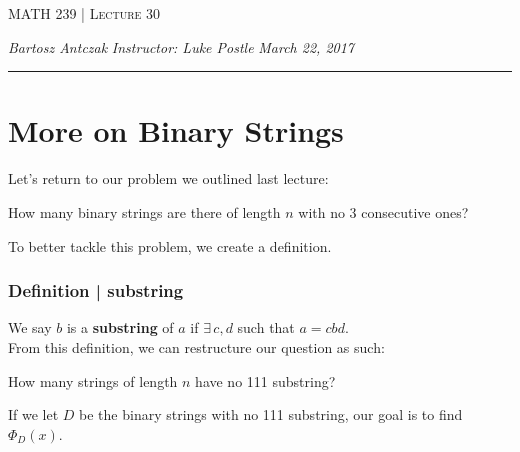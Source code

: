 \documentclass{report}
\newcommand{\lectureNum}{30}
\newcommand{\curDate}{March 22, 2017}
\newcommand{\course}{MATH 239}
\newcommand{\instructor}{Luke Postle}
\begin{document}
\begin{center}
\begin{Large}
\textsc{\course{} | Lecture \lectureNum{}}
\end{Large}
\end{center} 
\noindent \textit{Bartosz Antczak} \hfill
\textit{Instructor: \instructor{}} \hfill
\textit{\curDate{}}
\rule{\textwidth}{0.4pt}
\section{More on Binary Strings}
Let's return to our problem we outlined last lecture:
\begin{center}
How many binary strings are there of length $n$ with no 3 consecutive ones?
\end{center}
To better tackle this problem, we create a definition.
\subsubsection{Definition | substring}
We say $b$ is a \textbf{substring} of $a$ if $\exists \, c, d $ such that $a = cbd$.\\
From this definition, we can restructure our question as such:
\begin{center}
How many strings of length $n$ have no 111 substring?
\end{center}
If we let $D$ be the binary strings with no 111 substring, our goal is to find $\Phi_D(x)$.
\end{document}
